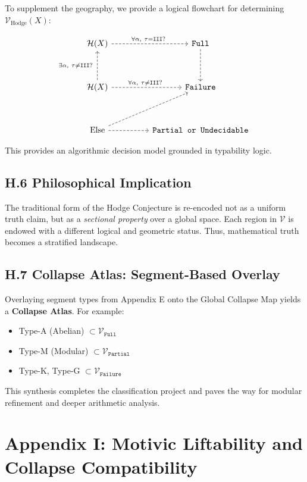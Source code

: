 \documentclass[11pt]{article}
\begin{document}
To supplement the geography, we provide a logical flowchart for determining $\mathcal{V}_{\text{Hodge}}(X)$:

\[
\begin{tikzcd}[row sep=3.5em, column sep=4.5em]
\mathcal{H}(X) 
  \arrow[r, dashed, "{\forall \alpha,\ \tau = \texttt{III}?\ }"]
  & \texttt{Full} 
  \arrow[d, dashed] \\
\mathcal{H}(X) 
  \arrow[u, dashed, "{\exists \alpha,\ \tau \ne \texttt{III}?\ }"]
  \arrow[r, dashed, "{\forall \alpha,\ \tau \ne \texttt{III}?\ }"]
  & \texttt{Failure} \\
\text{Else} 
  \arrow[ru, dashed] 
  \arrow[r, dashed] 
  & \texttt{Partial or Undecidable}
\end{tikzcd}
\]

This provides an algorithmic decision model grounded in typability logic.

\subsection*{H.6 Philosophical Implication}

The traditional form of the Hodge Conjecture is re-encoded not as a uniform truth claim, but as a \emph{sectional property} over a global space. Each region in $\mathcal{V}$ is endowed with a different logical and geometric status. Thus, mathematical truth becomes a stratified landscape.

\subsection*{H.7 Collapse Atlas: Segment-Based Overlay}

Overlaying segment types from Appendix E onto the Global Collapse Map yields a \textbf{Collapse Atlas}. For example:

\begin{itemize}
  \item Type-A (Abelian) $\subset \mathcal{V}_{\texttt{Full}}$
  \item Type-M (Modular) $\subset \mathcal{V}_{\texttt{Partial}}$
  \item Type-K, Type-G $\subset \mathcal{V}_{\texttt{Failure}}$
\end{itemize}

This synthesis completes the classification project and paves the way for modular refinement and deeper arithmetic analysis.



\section*{Appendix I: Motivic Liftability and Collapse Compatibility}
\end{document}
